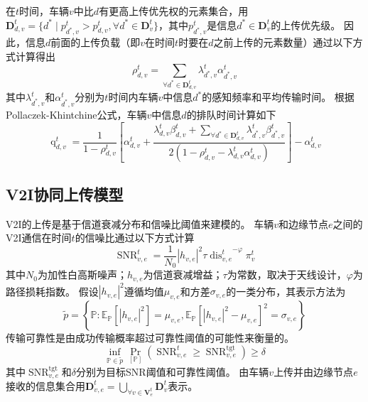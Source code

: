 在$t$时间，车辆$v$中比$d$有更高上传优先权的元素集合，用$\mathbf{D}_{d, v}^t = \{ d^* \mid p_{d^*, v}^{t} > p_{d, v}^{t} , \forall d^* \in \mathbf{D}_v^t \}$，其中$p_{d^*, v}^{t}$是信息$d^* \in \mathbf{D}_v^t$的上传优先级。
因此，信息$d$前面的上传负载（即$v$在时间$t$时要在$d$之前上传的元素数量）通过以下方式计算得出 
\begin{equation}
	\rho_{d, v}^{t}=\sum_{\forall d^* \in \mathbf{D}_{d, v}^t} \lambda_{d^*, v}^t \alpha_{d^*, v}^t
\end{equation}
其中$\lambda_{d^*, v}^t$和$\alpha_{d^*, v}^t$分别为$t$时间内车辆$v$中信息$d^*$的感知频率和平均传输时间。
根据Pollaczek-Khintchine公式\cite{takine2001queue}，车辆$v$中信息$d$的排队时间计算如下 
\begin{equation}
    \operatorname{q}_{d, v}^t= \frac{1} {1 - \rho_{d, v}^{t}} 
        \left[ \alpha_{d, v}^t + \frac{ \lambda_{d, v}^{t} \beta_{d, v}^t + \sum\limits_{\forall d^* \in \mathbf{D}_{d, v}^t} \lambda_{d^*, v}^t \beta_{d^*, v}^t }{2\left(1-\rho_{d, v}^{t} - \lambda_{d, v}^{t} \alpha_{d, v}^t\right)}\right] 
        - \alpha_{d, v}^t
\end{equation}

\subsection{V2I协同上传模型}
V2I的上传是基于信道衰减分布和信噪比阈值来建模的。
车辆$v$和边缘节点$e$之间的V2I通信在时间$t$的信噪比通过以下方式计算\cite{sadek2009distributed}
\begin{equation}
    \operatorname{SNR}_{v, e}^{t}=\frac{1}{N_{0}} \left|h_{v, e}\right|^{2} \tau {\operatorname{dis}_{v, e}^{t}}^{-\varphi} {\pi}_v^t
\end{equation}
其中$N_{0}$为加性白高斯噪声；$h_{v, e}$为信道衰减增益；$\tau$为常数，取决于天线设计，$\varphi$为路径损耗指数。
假设$\left|h_{v, e}\right|^{2}$遵循均值$\mu_{v, e}$和方差$\sigma_{v, e}$的一类分布，其表示方法为
\begin{equation}
    \tilde{p}=\left\{\mathbb{P}: \mathbb{E}_{\mathbb{P}}\left[\left|h_{v, e}\right|^{2}\right]=\mu_{v, e}, \mathbb{E}_{\mathbb{P}}\left[\left|h_{v, e}\right|^{2}-\mu_{v, e}\right]^{2}=\sigma_{v, e}\right\}
\end{equation}
传输可靠性是由成功传输概率超过可靠性阈值的可能性来衡量的。
\begin{equation}
    \inf_{\mathbb{P} \in \tilde{p}} \operatorname{Pr}_{[\mathbb{P}]}\left(\operatorname{SNR}_{v, e}^{t} \geq \operatorname{SNR}_{v, e}^{\operatorname{tgt}}\right) \geq \delta
\end{equation}
\noindent 其中$\operatorname{SNR}_{v, e}^{\operatorname{tgt}}$和$\delta$分别为目标SNR阈值和可靠性阈值。
由车辆$v$上传并由边缘节点$e$接收的信息集合用$\mathbf{D}_{v, e}^{t} = \bigcup_{\forall v \in \mathbf{V}_{e}^{t}} \mathbf{D}_{v}^{t}$表示。

